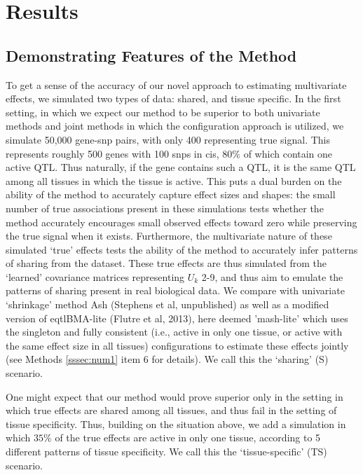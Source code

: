 
\section{Results}
\subsection{Demonstrating Features of the Method}

To get a sense of the accuracy of our novel approach to estimating multivariate effects, we simulated two types of data: shared, and tissue specific. In the first setting, in which we expect our method to be superior to both univariate methods and joint methods in which the configuration approach is utilized, we simulate 50,000 gene-snp pairs, with only 400 representing true signal. This represents roughly 500 genes with 100 snps in cis, $80\%$ of which contain one active QTL. Thus naturally, if the gene contains such a QTL, it is the same QTL among all tissues in which the tissue is active. This puts a dual burden on the ability of the method to accurately capture effect sizes and shapes: the small number of true associations present in these simulations tests whether the method accurately encourages small observed effects toward zero while preserving the true signal when it exists. Furthermore, the  multivariate nature of these simulated `true' effects tests the ability of the method to accurately infer patterns of sharing from the dataset. These true effects are thus simulated from the `learned' covariance matrices representing $U_{k}$ 2-9, and thus aim to emulate the patterns of sharing present in real biological data. We compare with univariate `shrinkage' method Ash (Stephens et al, unpublished) as well as a modified version of eqtlBMA-lite (Flutre et al, 2013), here deemed 'mash-lite' which uses the singleton and fully consistent (i.e., active in only one tissue, or active with the same effect size in all tissues) configurations to estimate these effects jointly (see Methods \ref{sssec:num1} item 6 for details). We call this the `sharing' (S) scenario. 

One might expect that our method would prove superior only in the setting in which true effects are shared among all tissues, and thus fail in the setting of tissue specificity. Thus, building on the situation above, we add a simulation in which $35\%$ of the true effects are active in only one tissue, according to 5 different patterns of tissue specificity. We call this the `tissue-specific' (TS) scenario. 

